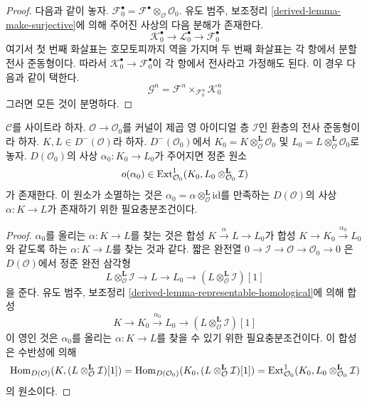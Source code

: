\begin{proof}
다음과 같이 놓자.
$\mathcal{F}_0^\bullet =
\mathcal{F}^\bullet \otimes_\mathcal{O} \mathcal{O}_0$.
유도 범주, 보조정리 \ref{derived-lemma-make-surjective}에 의해 주어진
사상의 다음 분해가 존재한다.
$$
\mathcal{K}_0^\bullet \to \mathcal{L}_0^\bullet \to \mathcal{F}_0^\bullet
$$
여기서 첫 번째 화살표는 호모토피까지 역을 가지며 두 번째 화살표는
각 항에서 분할 전사 준동형이다. 따라서
$\mathcal{K}_0^\bullet \to \mathcal{F}_0^\bullet$이 각 항에서
전사라고 가정해도 된다. 이 경우 다음과 같이 택한다.
$$
\mathcal{G}^n = \mathcal{F}^n \times_{\mathcal{F}^n_0} \mathcal{K}_0^n
$$
그러면 모든 것이 분명하다.
\end{proof}

\begin{lemma}
\label{lemma-inf-obs-map-defo-complex}
$\mathcal{C}$를 사이트라 하자. $\mathcal{O} \to \mathcal{O}_0$를
커널이 제곱 영 아이디얼 층 $\mathcal{I}$인 환층의 전사 준동형이라 하자.
$K, L \in D^-(\mathcal{O})$라 하자. $D^-(\mathcal{O}_0)$에서
$K_0 = K \otimes_\mathcal{O}^\mathbf{L} \mathcal{O}_0$ 및
$L_0 = L \otimes_\mathcal{O}^\mathbf{L} \mathcal{O}_0$로 놓자.
$D(\mathcal{O}_0)$의 사상 $\alpha_0 : K_0 \to L_0$가 주어지면
정준 원소
$$
o(\alpha_0) \in \mathop{\mathrm{Ext}}\nolimits^1_{\mathcal{O}_0}(K_0,
L_0 \otimes_{\mathcal{O}_0}^\mathbf{L} \mathcal{I})
$$
가 존재한다. 이 원소가 소멸하는 것은
$\alpha_0 = \alpha \otimes_\mathcal{O}^\mathbf{L} \text{id}$를 만족하는
$D(\mathcal{O})$의 사상 $\alpha : K \to L$가 존재하기 위한
필요충분조건이다.
\end{lemma}

\begin{proof}
$\alpha_0$를 올리는 $\alpha : K \to L$를 찾는 것은
합성 $K \xrightarrow{\alpha} L \to L_0$가
합성 $K \to K_0 \xrightarrow{\alpha_0} L_0$와 같도록 하는
$\alpha : K \to L$를 찾는 것과 같다. 짧은 완전열
$0 \to \mathcal{I} \to \mathcal{O} \to \mathcal{O}_0 \to 0$
은 $D(\mathcal{O})$에서 정준 완전 삼각형
$$
L \otimes_\mathcal{O}^\mathbf{L} \mathcal{I} \to
L \to
L_0 \to
(L \otimes_\mathcal{O}^\mathbf{L} \mathcal{I})[1]
$$
을 준다. 유도 범주, 보조정리
\ref{derived-lemma-representable-homological}에 의해 합성
$$
K \to K_0 \xrightarrow{\alpha_0} L_0 \to
(L \otimes_\mathcal{O}^\mathbf{L} \mathcal{I})[1]
$$
이 영인 것은 $\alpha_0$를 올리는 $\alpha : K \to L$를 찾을 수
있기 위한 필요충분조건이다. 이 합성은 수반성에 의해
$$
\mathop{\mathrm{Hom}}\nolimits_{D(\mathcal{O})}(K, (L \otimes_\mathcal{O}^\mathbf{L} \mathcal{I})[1]) =
\mathop{\mathrm{Hom}}\nolimits_{D(\mathcal{O}_0)}(K_0,
(L \otimes_\mathcal{O}^\mathbf{L} \mathcal{I})[1]) =
\mathop{\mathrm{Ext}}\nolimits^1_{\mathcal{O}_0}(K_0,
L_0 \otimes_{\mathcal{O}_0}^\mathbf{L} \mathcal{I})
$$
의 원소이다.
\end{proof}

